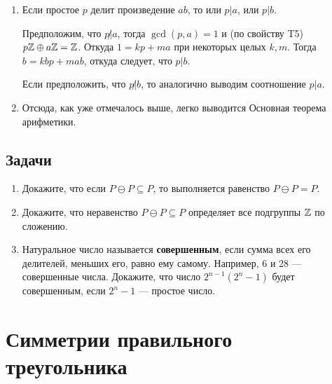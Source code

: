 \begin{enumerate}[T1]
\item Если простое $p$ делит произведение $ab$, то или $p|a$, или $p|b$.

Предположим, что $p\not|a$, тогда $\gcd(p,a)=1$ и (по свойству T5) $p\mathbb Z\oplus a\mathbb Z=\mathbb Z$. Откуда $1=kp+ma$ при некоторых целых $k,m$. Тогда $b=kbp+mab$, откуда следует, что $p|b$.

Если предположить, что $p\not|b$, то аналогично выводим соотношение $p|a$.
\item Отсюда, как уже отмечалось выше, легко выводится Основная теорема арифметики.
\end{enumerate}


\subsection*{Задачи}
\begin{enumerate}
\item Докажите, что если $P\ominus P\subseteq P$, то выполняется равенство $P\ominus P=P$.
\item Докажите, что неравенство $P\ominus P\subseteq P$ определяет все подгруппы $\mathbb Z$ по сложению.
\item Натуральное число называется \textbf{совершенным}, если сумма всех его делителей, меньших его, равно ему самому. Например, 6 и 28 --- совершенные числа. Докажите, что число $2^{n-1}(2^n-1)$ будет совершенным, если $2^n-1$ --- простое число.
\end{enumerate}





\section{Симметрии правильного треугольника}


